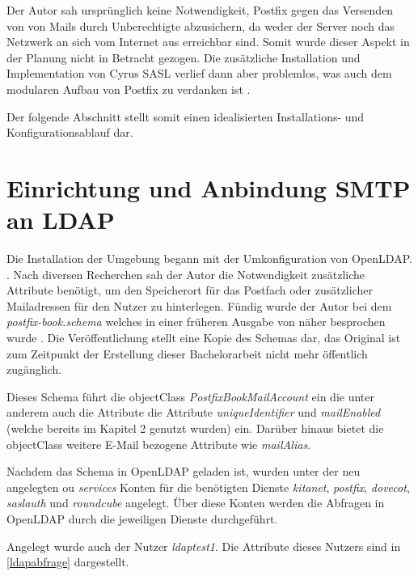 Der Autor sah ursprünglich keine Notwendigkeit, Postfix gegen das Versenden von von Mails durch Unberechtigte abzusichern, da weder der Server noch das Netzwerk an sich vom Internet aus erreichbar sind. 
Somit wurde dieser Aspekt in der Planung nicht in Betracht gezogen. 
Die zusätzliche Installation und Implementation von Cyrus SASL verlief dann aber problemlos, was auch dem modularen Aufbau von Postfix zu verdanken ist \citep[zu Postfix und Cyrus SASL vgl][S. 210 ff.]{Heinlein2004}.

Der folgende Abschnitt stellt somit einen idealisierten Installations- und Konfigurationsablauf dar.

\section{Einrichtung und Anbindung SMTP an LDAP}

Die Installation der Umgebung begann mit der Umkonfiguration von OpenLDAP.  \citep[][615]{Deimeke2019}. 
Nach diversen Recherchen sah der Autor die Notwendigkeit zusätzliche Attribute benötigt, um den Speicherort für das Postfach oder zusätzlicher Mailadressen für den Nutzer zu hinterlegen. 
Fündig wurde der Autor bei dem \textit{postfix-book.schema} welches in einer früheren Ausgabe von \cite{Heinlein2004} näher besprochen wurde \citep[vgl.][]{pfschema}. Die Veröffentlichung stellt eine Kopie des Schemas dar, das Original ist zum Zeitpunkt der Erstellung dieser Bachelorarbeit nicht mehr öffentlich zugänglich.

Dieses Schema führt die objectClass \textit{PostfixBookMailAccount} ein die unter anderem auch die Attribute die Attribute \textit{uniqueIdentifier} und \textit{mailEnabled} (welche bereits im Kapitel 2 genutzt wurden) ein. Darüber hinaus bietet die objectClass weitere E-Mail bezogene Attribute wie \zb \textit{mailAlias}.  

Nachdem das Schema in OpenLDAP geladen ist, wurden unter der neu angelegten \ac{ou} \textit{services} Konten für die benötigten Dienste \textit{kitanet}, \textit{postfix}, \textit{dovecot}, \textit{saslauth} und \textit{roundcube} angelegt. 
Über diese Konten werden die Abfragen in OpenLDAP durch die jeweiligen Dienste durchgeführt. 

Angelegt wurde auch der Nutzer \textit{ldaptest1}. Die Attribute dieses Nutzers sind in \autoref{ldapabfrage} dargestellt.


